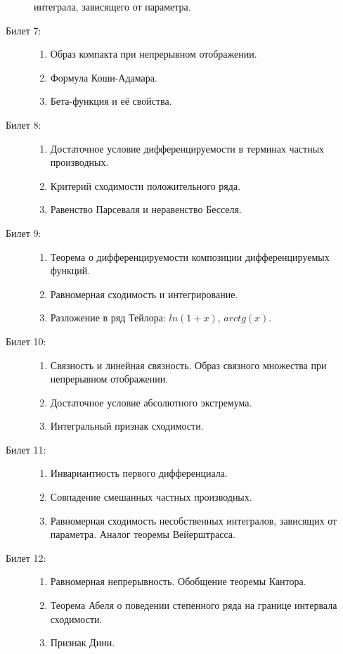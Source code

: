 \documentclass{article}
\begin{document}
\begin{description}
\begin{enumerate}
		 интеграла, зависящего от параметра.
	\end{enumerate}
	\item[Билет 7:]\phantom{}
	\begin{enumerate}
		\item Образ компакта при непрерывном отображении.
		\item Формула Коши-Адамара.
		\item Бета-функция и её свойства.
	\end{enumerate}
	\item[Билет 8:]\phantom{}
	\begin{enumerate}
		\item Достаточное условие дифференцируемости в терминах
		частных производных.
		\item Критерий сходимости положительного ряда.
		\item Равенство Парсеваля и неравенство Бесселя.
	\end{enumerate}
	\item[Билет 9:]\phantom{}
	\begin{enumerate}
		\item Теорема о дифференцируемости композиции дифференцируемых
		функций.
		\item Равномерная сходимость и интегрирование.
		\item Разложение в ряд Тейлора: $ln(1 + x)$, $arc tg(x)$.
	\end{enumerate}
	\item[Билет 10:]\phantom{}
	\begin{enumerate}
		\item Связность и линейная связность. Образ связного множества
		при непрерывном отображении.
		\item Достаточное условие абсолютного экстремума.
		\item Интегральный признак сходимости.
	\end{enumerate}
	\item[Билет 11:]\phantom{}
	\begin{enumerate}
		\item Инвариантность первого дифференциала.
		\item Совпадение смешанных частных производных.
		\item Равномерная сходимость несобственных интегралов,
		зависящих от параметра. Аналог теоремы Вейерштрасса.
	\end{enumerate}
	\item[Билет 12:]\phantom{}
	\begin{enumerate}
		\item Равномерная непрерывность. Обобщение теоремы Кантора.
		\item Теорема Абеля о поведении степенного ряда на границе
		интервала сходимости.
		\item Признак Дини.
	\end{enumerate}
\end{description}
\end{document}
